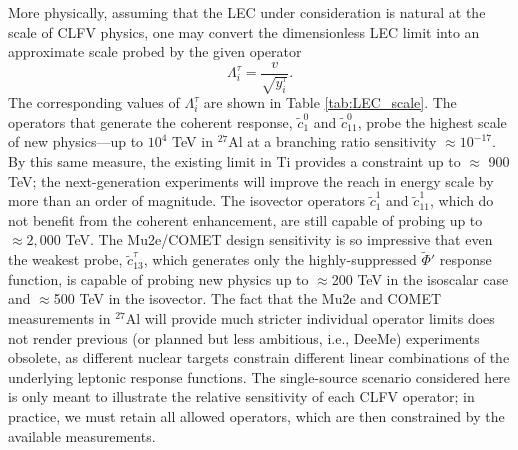 \documentclass[12pt,letterpaper]{book}
\begin{document}
More physically, assuming that the LEC under consideration is natural at the scale of CLFV physics, one may convert the dimensionless LEC limit into an approximate scale probed by the given operator
\begin{equation}
\Lambda_i^{\tau}=\frac{v}{\sqrt{y_i^{\tau}}}.
\end{equation}
The corresponding values of $\Lambda_i^{\tau}$ are shown in Table \ref{tab:LEC_scale}. The operators that generate the coherent response, $\tilde{c}_1^0$ and $\tilde{c}_{11}^0$, probe the highest scale of new physics---up to $10^4$ TeV in $^{27}$Al at a branching ratio sensitivity $\approx 10^{-17}$. By this same measure, the existing limit in Ti provides a constraint up to $\approx$ 900 TeV; the next-generation experiments will improve the reach in energy scale by more than an order of magnitude. The isovector operators $\tilde{c}_1^1$ and $\tilde{c}_{11}^1$, which do not benefit from the coherent enhancement, are still capable of probing up to $\approx 2,000$ TeV. The Mu2e/COMET design sensitivity is so impressive that even the weakest probe, $\tilde{c}_{13}^{\tau}$, which generates only the highly-suppressed $\tilde{\Phi}'$ response function, is capable of probing new physics up to $\approx$200 TeV in the isoscalar case and $\approx$500 TeV in the isovector. The fact that the Mu2e and COMET measurements in $^{27}$Al will provide much stricter individual operator limits does not render previous (or planned but less ambitious, i.e., DeeMe) experiments obsolete, as different nuclear targets constrain different linear combinations of the underlying leptonic response functions. The single-source scenario considered here is only meant to illustrate the relative sensitivity of each CLFV operator; in practice, we must retain all allowed operators, which are then constrained by the available measurements.
\end{document}
